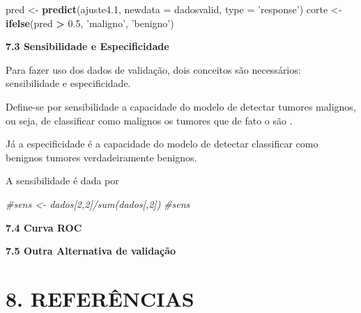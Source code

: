 \documentclass[
]{article}
\newenvironment{Shaded}{\begin{snugshade}}{\end{snugshade}}
\newcommand{\CommentTok}[1]{\textcolor[rgb]{0.56,0.35,0.01}{\textit{#1}}}
\newcommand{\DataTypeTok}[1]{\textcolor[rgb]{0.13,0.29,0.53}{#1}}
\newcommand{\FloatTok}[1]{\textcolor[rgb]{0.00,0.00,0.81}{#1}}
\newcommand{\KeywordTok}[1]{\textcolor[rgb]{0.13,0.29,0.53}{\textbf{#1}}}
\newcommand{\NormalTok}[1]{#1}
\newcommand{\OperatorTok}[1]{\textcolor[rgb]{0.81,0.36,0.00}{\textbf{#1}}}
\newcommand{\StringTok}[1]{\textcolor[rgb]{0.31,0.60,0.02}{#1}}
\begin{document}
\begin{Shaded}
\begin{Highlighting}[]
\NormalTok{pred <-}\StringTok{ }\KeywordTok{predict}\NormalTok{(ajuste4}\FloatTok{.1}\NormalTok{, }\DataTypeTok{newdata =}\NormalTok{ dadosvalid, }\DataTypeTok{type =} \StringTok{'response'}\NormalTok{)}
\NormalTok{corte <-}\StringTok{ }\KeywordTok{ifelse}\NormalTok{(pred }\OperatorTok{>}\StringTok{ }\FloatTok{0.5}\NormalTok{, }\StringTok{'maligno'}\NormalTok{, }\StringTok{'benigno'}\NormalTok{)}
\end{Highlighting}
\end{Shaded}

\textbf{7.3 Sensibilidade e Especificidade}

Para fazer uso dos dados de validação, dois conceitos são necessários:
sensibilidade e especificidade.

Define-se por sensibilidade a capacidade do modelo de detectar tumores
malignos, ou seja, de classificar como malignos os tumores que de fato o
são .

Já a especificidade é a capacidade do modelo de detectar classificar
como benignos tumores verdadeiramente benignos.

A sensibilidade é dada por

\begin{Shaded}
\begin{Highlighting}[]
\CommentTok{#sens <- dados[2,2]/sum(dados[,2])}
\CommentTok{#sens }
\end{Highlighting}
\end{Shaded}

\textbf{7.4 Curva ROC}

\textbf{7.5 Outra Alternativa de validação}

\hypertarget{referuxeancias}{%
\section{8. REFERÊNCIAS}\label{referuxeancias}}
\end{document}
